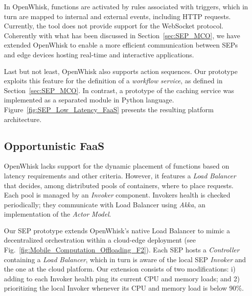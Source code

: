 \documentclass[letterpaper, 10 pt, conference]{ieeeconf}  %
\begin{document}

In OpenWhisk, functions are activated by rules associated with triggers, which in turn are mapped to internal and external events, including HTTP requests. Currently, the tool does not provide support for the WebSocket protocol. Coherently with what has been discussed in Section~\ref{sec:SEP_MCO}, we have extended OpenWhisk to enable a more efficient communication between SEPs and edge devices hosting real-time and interactive applications.  



Last but not least, OpenWhisk also supports action sequences. Our prototype exploits this feature for the definition of a \textit{workflow service}, as defined in Section~\ref{sec:SEP_MCO}. In contrast, a prototype of the caching service was implemented as a separated module in Python language. Figure~\ref{fig:SEP_Low_Latency_FaaS} presents the resulting platform architecture.



\subsection{Opportunistic FaaS}



OpenWhisk lacks support for the dynamic placement of functions based on latency requirements and other criteria. However, it features a \textit{Load Balancer} that decides, among distributed pools of containers, where to place requests. Each pool is managed by an \textit{Invoker} component. Invokers health is checked periodically; they communicate with Load Balancer using \textit{Akka}, an implementation of the \textit{Actor Model}.

Our SEP prototype extends OpenWhisk's native Load Balancer to mimic a decentralized orchestration within a cloud-edge deployment (see Fig.~\ref{fig:Mobile_Computation_Offloading_F2}). Each SEP hosts a \textit{Controller} containing a \textit{Load Balancer}, which in turn is aware of the local SEP \textit{Invoker} and the one at the cloud platform. Our extension consists of two modifications: i) adding to each Invoker health ping its current CPU and memory loads; and 2) prioritizing the local Invoker whenever its CPU and memory load is below 90\%.   
\end{document}
